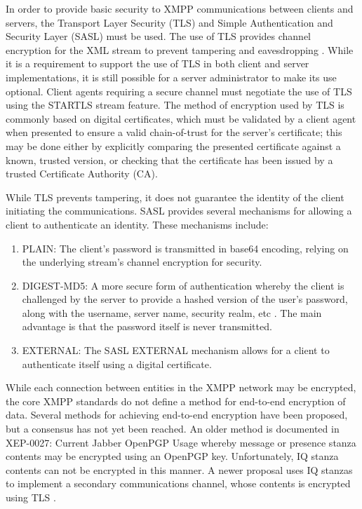 In order to provide basic security to XMPP communications between clients and
servers, the Transport Layer Security (TLS) \cite{TLS} and Simple Authentication
and Security Layer (SASL) \cite{SASL} must be used. The use of TLS provides
channel encryption for the XML stream to prevent tampering and eavesdropping
\cite{RFC3920}. While it is a requirement to support the use of TLS in
both client and server implementations, it is still possible for a server
administrator to make its use optional. Client agents requiring a secure
channel must negotiate the use of TLS using the STARTLS \cite{RFC3920} stream
feature. The method of encryption used by TLS is commonly based on digital
certificates, which must be validated by a client agent when presented to ensure
a valid chain-of-trust for the server's certificate; this may be done either by
explicitly comparing the presented certificate against a known, trusted version,
or checking that the certificate has been issued by a trusted Certificate
Authority (CA).

While TLS prevents tampering, it does not guarantee the identity of the client
initiating the communications. SASL provides several mechanisms for allowing
a client to authenticate an identity. These mechanisms include:
\begin{enumerate}
\item PLAIN: The client's password is transmitted in base64 encoding, relying
on the underlying stream's channel encryption for security.
\item DIGEST-MD5: A more secure form of authentication whereby the client is
challenged by the server to provide a hashed version of the user's password,
along with the username, server name, security realm, etc \cite{RFC2831}. The
main advantage is that the password itself is never transmitted.
\item EXTERNAL: The SASL EXTERNAL mechanism allows for a client to authenticate
itself using a digital certificate.
\end{enumerate}

While each connection between entities in the XMPP network may be encrypted,
the core XMPP standards do not define a method for end-to-end encryption of
data. Several methods for achieving end-to-end encryption have been proposed,
but a consensus has not yet been reached. An older method is documented in
XEP-0027: Current Jabber OpenPGP Usage \cite{XEP-0027} whereby message or
presence stanza contents may be encrypted using an OpenPGP key. Unfortunately,
IQ stanza contents can not be encrypted in this manner. A newer proposal uses
IQ stanzas to implement a secondary communications channel, whose contents is
encrypted using TLS \cite{XMPP-E2E}.

